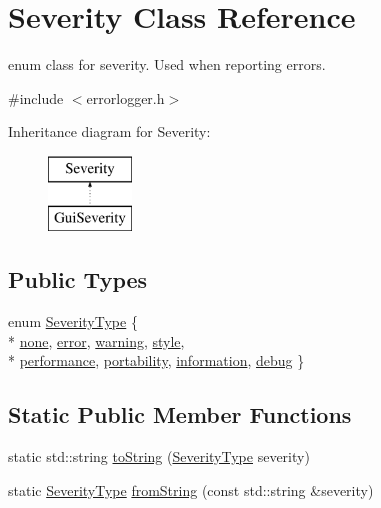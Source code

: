 \hypertarget{class_severity}{\section{Severity Class Reference}
\label{class_severity}
}


enum class for severity. Used when reporting errors.  




{\ttfamily \#include $<$errorlogger.\-h$>$}

Inheritance diagram for Severity\-:\begin{figure}[H]
\begin{center}
\leavevmode
\includegraphics[height=2.000000cm]{class_severity}
\end{center}
\end{figure}
\subsection*{Public Types}
\begin{DoxyCompactItemize}
\item 
enum \hyperlink{class_severity_ac185938ae084355bbf1790cf1a70caa6}{Severity\-Type} \{ \\*
\hyperlink{class_severity_ac185938ae084355bbf1790cf1a70caa6ad4f4cb9fe0113d7830e57fe3bc1cadf6}{none}, 
\hyperlink{class_severity_ac185938ae084355bbf1790cf1a70caa6ae24df992f36773de88bd9d04501e2a22}{error}, 
\hyperlink{class_severity_ac185938ae084355bbf1790cf1a70caa6a09546b0bdebb1927e354943d76d1ece3}{warning}, 
\hyperlink{class_severity_ac185938ae084355bbf1790cf1a70caa6af063007296e71e4676ed95c8c8688464}{style}, 
\\*
\hyperlink{class_severity_ac185938ae084355bbf1790cf1a70caa6a1e26a833c74f1b8573c51f19339671d2}{performance}, 
\hyperlink{class_severity_ac185938ae084355bbf1790cf1a70caa6a427317a70b865d896d74e8138c44c155}{portability}, 
\hyperlink{class_severity_ac185938ae084355bbf1790cf1a70caa6a06fc099ae2ca799fe56959a600d511cc}{information}, 
\hyperlink{class_severity_ac185938ae084355bbf1790cf1a70caa6a3a8aba6160588f90edf01c2131df491e}{debug}
 \}
\end{DoxyCompactItemize}
\subsection*{Static Public Member Functions}
\begin{DoxyCompactItemize}
\item 
static std\-::string \hyperlink{class_severity_a02d12b54985fbd8c792e12683befc9ef}{to\-String} (\hyperlink{class_severity_ac185938ae084355bbf1790cf1a70caa6}{Severity\-Type} severity)
\item 
static \hyperlink{class_severity_ac185938ae084355bbf1790cf1a70caa6}{Severity\-Type} \hyperlink{class_severity_a0f9675c1429baf02e321a6d1c918269b}{from\-String} (const std\-::string \&severity)
\end{DoxyCompactItemize}


